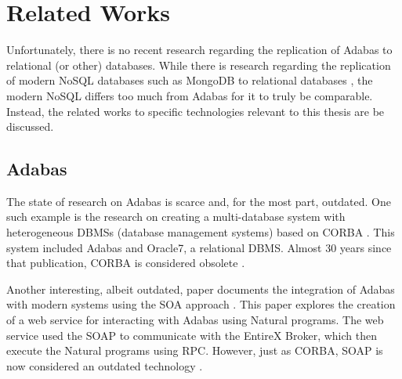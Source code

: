 \chapter{Related Works}
\label{ch03:litreview}
Unfortunately, there is no recent research regarding the replication of Adabas to relational (or other) databases. While there is research regarding the replication of modern NoSQL databases such as MongoDB to relational databases \cite{aftabnosqletltordbms}, the modern NoSQL differs too much from Adabas for it to truly be comparable. Instead, the related works to specific technologies relevant to this thesis are be discussed.

\section{Adabas}
\label{ch03:litreview:adabas}
The state of research on Adabas is scarce and, for the most part, outdated. One such example is the research on creating a multi-database system with heterogeneous DBMSs (database management systems) based on \ac{CORBA} \cite{ozhan1996making}. This system included Adabas and Oracle7, a relational DBMS. Almost 30 years since that publication, \ac{CORBA} is considered obsolete \cite{fallofcorba}.

Another interesting, albeit outdated, paper documents the integration of Adabas with modern systems using the \ac{SOA} approach \cite{koschelmainframemodernization}. This paper explores the creation of a web service for interacting with Adabas using Natural programs. The web service used the \ac{SOAP} to communicate with the EntireX Broker, which then execute the Natural programs using \ac{RPC}. However, just as \ac{CORBA}, \ac{SOAP} is now considered an outdated technology \cite{soapoutdated}.

